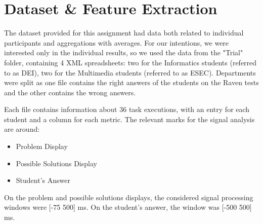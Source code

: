 \documentclass[extendedabs]{recpad2k}
\begin{document}


\section{Dataset \& Feature Extraction}

The dataset provided for this assignment had data both related to individual participants and aggregations with averages.
For our intentions, we were interested only in the individual results, so we used the data from the "Trial" folder, containing 4 XML spreadsheets: two for the 
Informatics students (referred to as DEI), two for the Multimedia students (referred to as ESEC).
Departments were split as one file contains the right answers of the students on the Raven tests and the other contains the wrong answers.

Each file contains information about 36 task executions, with an entry for each student and a column for each metric. 
The relevant marks for the signal analysis are around: 
\begin{itemize}[noitemsep,nolistsep]
\item Problem Display
\item Possible Solutions Display
\item Student's Answer
\end{itemize}
\vspace{2pt}
On the problem and possible solutions displays, the considered signal processing windows were [-75 500] ms.
On the student's answer, the window was [-500 500] ms.
\end{document}
